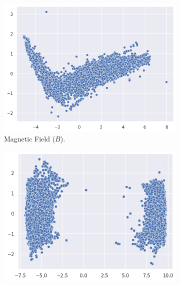 \begin{figure}[h]
    \caption[PCA applied to the different variables]{PCA applied to the different variables. (a) and (b) represent the PCAs of the magnetic field variable ($B[G]$) and the flux-tube inclination variable ($\alpha [deg]$), respectively; (c) is the PCA of all input variables combined.}
    \label{fig:pca_mag_2d}
    \begin{subfigure}[h]{0.329\textwidth}
        \centering
        \includegraphics[width=\textwidth]{figures/mag_pca_2d.png}
        \caption{Magnetic Field ($B$).}
        \label{fig:pca_mag_2d}
    \end{subfigure}
    \hfill
    \begin{subfigure}[h]{0.329\textwidth}
        \centering
        \includegraphics[width=\textwidth]{figures/alpha_pca_2d.png}

\end{subfigure}
\end{figure}
